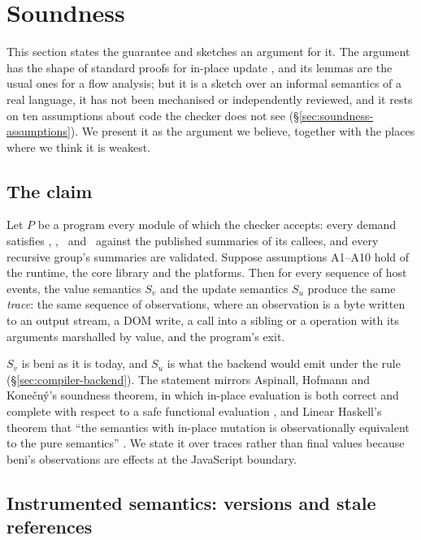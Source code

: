 \section{Soundness}
\label{sec:soundness}

This section states the guarantee and sketches an argument for it. The argument has the shape of
standard proofs for in-place update \citep{aspinall2008usage,bernardy2018linear}, and its lemmas are
the usual ones for a flow analysis; but it is a sketch over an informal semantics of a real
language, it has not been mechanised or independently reviewed, and it rests on ten assumptions about
code the checker does not see (\S\ref{sec:soundness-assumptions}). We present it as the argument we
believe, together with the places where we think it is weakest.

\subsection{The claim}

\begin{theorem}
\label{thm:main}
Let $P$ be a program every module of which the checker accepts: every demand satisfies \Known,
\Unescaped, \Dead\ and \Disjoint\ against the published summaries of its callees, and every recursive
group's summaries are validated. Suppose assumptions A1--A10 hold of the runtime, the core library and
the platforms. Then for every sequence of host events, the value semantics $S_v$ and the update
semantics $S_u$ produce the same \emph{trace}: the same sequence of observations, where an
observation is a byte written to an output stream, a DOM write, a call into a  sibling
or a  operation with its arguments marshalled by value, and the program's exit.
\end{theorem}

$S_v$ is beni as it is today, and $S_u$ is what the backend would emit under the rule
(\S\ref{sec:compiler-backend}). The statement mirrors Aspinall, Hofmann and Kone\v{c}n\'y's soundness
theorem, in which in-place evaluation is both correct and complete with respect to a safe functional
evaluation \citep[Thm.~5.8]{aspinall2008usage}, and Linear Haskell's theorem that ``the semantics with
in-place mutation is observationally equivalent to the pure semantics''
\citep[Thm.~3.9]{bernardy2018linear}. We state it over traces rather than final values because beni's
observations are effects at the JavaScript boundary.

\subsection{Instrumented semantics: versions and stale references}

